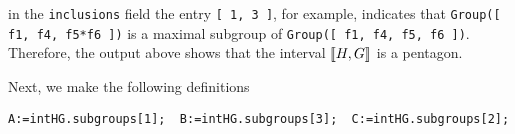 in the {\tt inclusions} field the entry {\tt [ 1, 3 ]}, for example, indicates that 
{\tt Group([ f1, f4, f5*f6 ])} is a maximal subgroup of 
{\tt Group([ f1, f4, f5, f6 ])}.
Therefore, the \gap output above shows that the interval 
$\llbracket H, G \rrbracket$ is a pentagon.

Next, we make the following definitions 

{\small 
\begin{verbatim}
A:=intHG.subgroups[1];  B:=intHG.subgroups[3];  C:=intHG.subgroups[2];
\end{verbatim}
}






